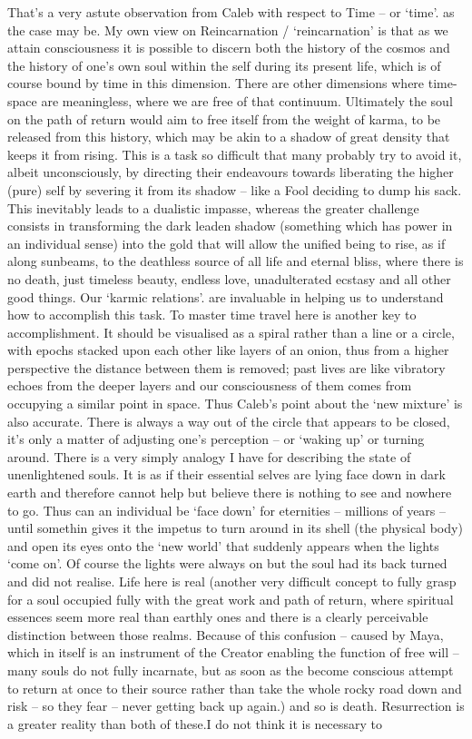 \begin{footnotesize}
\begin{sffamily}
That's a very astute observation from Caleb with respect to Time – or `time'. as the case may be. My own view on Reincarnation / `reincarnation' is that as we attain consciousness it is possible to discern both the history of the cosmos and the history of one's own soul within the self during its present life, which is of course bound by time in this dimension. There are other dimensions where time-space are meaningless, where we are free of that continuum. Ultimately the soul on the path of return would aim to free itself from the weight of karma, to be released from this history, which may be akin to a shadow of great density that keeps it from rising. This is a task so difficult that many probably try to avoid it, albeit unconsciously, by directing their endeavours towards liberating the higher (pure) self by severing it from its shadow – like a Fool deciding to dump his sack. This inevitably leads to a dualistic impasse, whereas the greater challenge consists in transforming the dark leaden shadow (something which has power in an individual sense) into the gold that will allow the unified being to rise, as if along sunbeams, to the deathless source of all life and eternal bliss, where there is no death, just timeless beauty, endless love, unadulterated ecstasy and all other good things. Our `karmic relations'. are invaluable in helping us to understand how to accomplish this task. To master time travel here is another key to accomplishment. It should be visualised as a spiral rather than a line or a circle, with epochs stacked upon each other like layers of an onion, thus from a higher perspective the distance between them is removed; past lives are like vibratory echoes from the deeper layers and our consciousness of them comes from occupying a similar point in space. Thus Caleb's point about the `new mixture' is also accurate. There is always a way out of the circle that appears to be closed, it's only a matter of adjusting one's perception – or `waking up' or turning around. There is a very simply analogy I have for describing the state of unenlightened souls. It is as if their essential selves are lying face down in dark earth and therefore cannot help but believe there is nothing to see and nowhere to go. Thus can an individual be `face down' for eternities – millions of years – until somethin gives it the impetus to turn around in its shell (the physical body) and open its eyes onto the `new world' that suddenly appears when the lights `come on'. Of course the lights were always on but the soul had its back turned and did not realise. Life here is real (another very difficult concept to fully grasp for a soul occupied fully with the great work and path of return, where spiritual essences seem more real than earthly ones and there is a clearly perceivable distinction between those realms. Because of this confusion – caused by Maya, which in itself is an instrument of the Creator enabling the function of free will – many souls do not fully incarnate, but as soon as the become conscious attempt to return at once to their source rather than take the whole rocky road down and risk – so they fear – never getting back up again.) and so is death. Resurrection is a greater reality than both of these.I do not think it is necessary to 
\end{sffamily}
\end{footnotesize}
